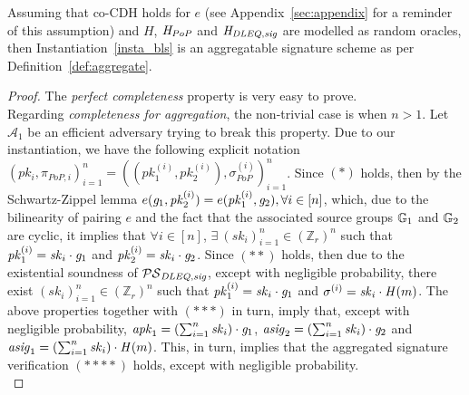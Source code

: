 \begin{theorem} Assuming that co-CDH holds for $e$ (see Appendix~\ref{sec:appendix} for a reminder of this assumption) 
and $H$, $\mathit{H}_{\mathit{PoP}}$ and $\mathit{H}_{\mathit{DLEQ}, \mathit{sig}}$ are modelled as random oracles, then Instantiation~\ref{insta_bls} 
is an aggregatable signature scheme as per Definition~\ref{def:aggregate}. 
\end{theorem}
\begin{proof} 
The \emph{perfect completeness} property is very easy to prove. \\ 
\noindent Regarding \emph{completeness for aggregation}, the non-trivial case is when $n>1$. 
Let $\mathcal{A}_1$ be an efficient adversary trying to break this property. Due to our instantiation, 
we have the following explicit notation 
$(\mathit{pk_i}, \pi_{\mathit{PoP},i})_{i=1}^n = ((\mathit{pk_1^{(i)}}, \mathit{pk_2^{(i)}}), \sigma^{(i)}_{\mathit{PoP}})_{i=1}^n$. 
Since $(\ast)$ holds, then by the Schwartz-Zippel lemma 
$e(\mathit{g}_{1}, \mathit{pk}_2^{(i)}) = e(\mathit{pk}_1^{(i)}, \mathit{g}_{2}), \forall i \in [n]$, which, due to the bilinearity of pairing $e$ 
and the fact that the associated source groups $\mathbb{G}_{1}$ and $\mathbb{G}_{2}$ are cyclic, it implies that 
$\forall i \in [n]$, $\exists \ (\mathit{sk}_i)_{i=1}^n \in (\mathbb{Z}_r)^{n}$ such that $\mathit{pk}_1^{(i)} = \mathit{sk}_i \cdot \mathit{g}_{1}$ and 
$\mathit{pk}_2^{(i)} = \mathit{sk}_i \cdot \mathit{g}_{2}$. Since $(\ast\ast)$ holds, then due to the existential soundness of $\mathcal{PS}_{\mathit{DLEQ}, \mathit{sig}}$,  
except with negligible probability, there exist $(\mathit{sk}_i)_{i=1}^n \in (\mathbb{Z}_r)^{n}$ such that 
$\mathit{pk}_1^{(i)} = \mathit{sk}_i \cdot \mathit{g}_{1}$ and $\sigma^{(i)} = \mathit{sk}_i \cdot \mathit{H}(m)$. 
The above properties together with $(\ast\ast\ast)$ in turn, imply that, except with negligible probability, 
$\mathit{apk}_1 = (\sum_{i=1}^n \mathit{sk}_i) \cdot \mathit{g}_{1}$, $\mathit{asig}_2 = (\sum_{i=1}^n \mathit{sk}_i) \cdot \mathit{g}_{2}$ and 
$\mathit{asig}_1 = (\sum_{i=1}^n \mathit{sk}_i) \cdot \mathit{H}(m)$. This, in turn, implies that the aggregated signature verification $(\ast\ast\ast\ast)$ 
holds, except with negligible probability. \\ 


\end{proof}
